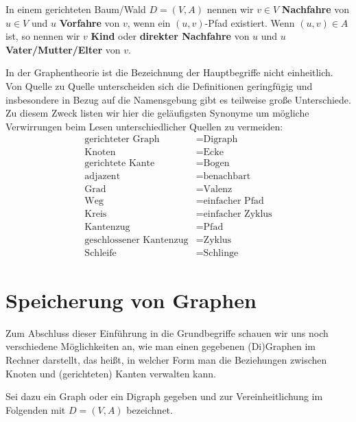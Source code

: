 \begin{defn}
	In einem gerichteten Baum/Wald $D=(V,A)$ nennen wir $v \in V$ \textbf{Nachfahre} von $u \in V$ und $u$ \textbf{Vorfahre} von $v$, wenn ein $(u,v)$-Pfad existiert. Wenn $(u,v) \in A$ ist, so nennen wir $v$ \textbf{Kind} oder \textbf{direkter Nachfahre} von $u$ und $u$ \textbf{Vater/Mutter/Elter} von $v$.
\end{defn} 


\begin{bem}
In der Graphentheorie ist die Bezeichnung der Hauptbegriffe nicht einheitlich.
Von Quelle zu Quelle unterscheiden sich die Definitionen geringfügig und insbesondere in Bezug auf die Namensgebung gibt es teilweise große Unterschiede.
Zu diesem Zweck listen wir hier die geläufigsten Synonyme um mögliche Verwirrungen beim Lesen unterschiedlicher Quellen zu vermeiden:
\begin{align*}
\text{gerichteter Graph} &= \text{Digraph}\\
\text{Knoten} &= \text{Ecke}\\
\text{gerichtete Kante} &= \text{Bogen}\\
\text{adjazent} &= \text{benachbart}\\
\text{Grad} &= \text{Valenz}\\
\text{Weg} &= \text{einfacher Pfad}\\
\text{Kreis} &= \text{einfacher Zyklus}\\
\text{Kantenzug} &= \text{Pfad}\\
\text{geschlossener Kantenzug} &= \text{Zyklus}\\
\text{Schleife} &= \text{Schlinge}
\end{align*}
\end{bem}

\section{Speicherung von Graphen} 

\begin{bem}
Zum Abschluss dieser Einführung in die Grundbegriffe schauen wir uns noch verschiedene Möglichkeiten an, wie man einen gegebenen (Di)Graphen im Rechner darstellt, das heißt, in welcher Form man die Beziehungen zwischen Knoten und (gerichteten) Kanten verwalten kann.

Sei dazu ein Graph oder ein Digraph gegeben und zur Vereinheitlichung im Folgenden mit $D=(V,A)$ bezeichnet.
\end{bem} 


